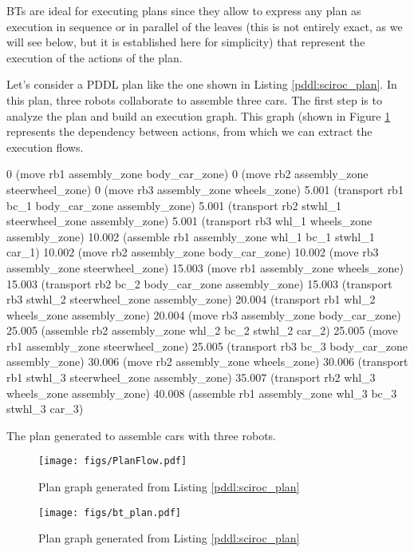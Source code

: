 \documentclass[letterpaper, 10 pt, conference]{IEEEtran}
\begin{document}
BTs are ideal for executing plans since they allow to express any plan as execution in sequence or in parallel of the leaves (this is not entirely exact, as we will see below, but it is established here for simplicity) that represent the execution of the actions of the plan.

Let's consider a PDDL plan like the one shown in Listing \ref{pddl:sciroc_plan}. In this plan, three robots collaborate to assemble three cars. The first step is to analyze the plan and build an execution graph. This graph (shown in Figure \ref{fig:planflow} represents the dependency between actions, from which we can extract the execution flows. 

\begin{pddl}[h!]
\scriptsize  
\begin{verbatimtab}
0	(move rb1 assembly_zone body_car_zone)
0	(move rb2 assembly_zone steerwheel_zone)
0	(move rb3 assembly_zone wheels_zone)
5.001	(transport rb1 bc_1 body_car_zone assembly_zone)
5.001	(transport rb2 stwhl_1 steerwheel_zone assembly_zone)
5.001	(transport rb3 whl_1 wheels_zone assembly_zone)
10.002	(assemble rb1 assembly_zone whl_1 bc_1 stwhl_1 car_1)
10.002	(move rb2 assembly_zone body_car_zone)
10.002	(move rb3 assembly_zone steerwheel_zone)
15.003	(move rb1 assembly_zone wheels_zone)
15.003	(transport rb2 bc_2 body_car_zone assembly_zone)
15.003	(transport rb3 stwhl_2 steerwheel_zone assembly_zone)
20.004	(transport rb1 whl_2 wheels_zone assembly_zone)
20.004	(move rb3 assembly_zone body_car_zone)
25.005	(assemble rb2 assembly_zone whl_2 bc_2 stwhl_2 car_2)
25.005	(move rb1 assembly_zone steerwheel_zone)
25.005	(transport rb3 bc_3 body_car_zone assembly_zone)
30.006	(move rb2 assembly_zone wheels_zone)
30.006	(transport rb1 stwhl_3 steerwheel_zone assembly_zone)
35.007	(transport rb2 whl_3 wheels_zone assembly_zone)
40.008	(assemble rb1 assembly_zone whl_3 bc_3 stwhl_3 car_3)
\end{verbatimtab}
\caption{\label{pddl:sciroc_plan}The plan generated to assemble cars with three robots.}
\normalsize
\end{pddl}

\begin{figure}[ht!]
  \centering
  \texttt{[image: figs/PlanFlow.pdf]}
  \caption{Plan graph generated from Listing \ref{pddl:sciroc_plan}}
  \label{fig:planflow}
\end{figure}

\begin{figure*}[tb]
  \centering
  \texttt{[image: figs/bt\_plan.pdf]}
  \caption{Plan graph generated from Listing \ref{pddl:sciroc_plan}}
  \label{fig:bt_plan}
\end{figure*}
\end{document}
